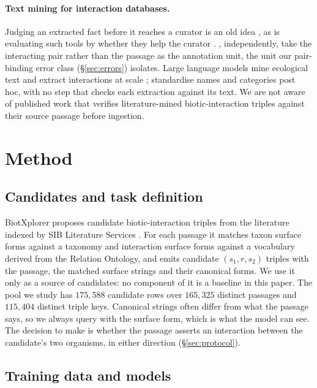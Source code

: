 \documentclass[11pt]{article}
\begin{document}
\paragraph{Text mining for interaction databases.}
Judging an extracted fact before it reaches a curator is an old idea
\citep{rodriguezesteban2006imitating}, as is evaluating such tools by whether they help the curator
\citep{hirschman2012biocuration,britan2018nexta5,lee2018scaling}. \citet{cuzick2023interspecies},
independently, take the interacting pair rather than the passage as the annotation unit, the unit
our pair-binding error class (\S\ref{sec:errors}) isolates. Large language models mine ecological text
\citep{farrell2024landscape,dsouza2025mining} and extract interactions at scale
\citep{keck2025extracting,zou2026llm}; \citet{zou2026llm} standardise names and categories post
hoc, with no step that checks each extraction against its text. We are not aware of published work
that verifies literature-mined biotic-interaction triples against their source passage before
ingestion.

\section{Method}
\label{sec:method}

\subsection{Candidates and task definition}
\label{sec:setting}

BiotXplorer \citep{ruch2024biotxplorer} proposes candidate biotic-interaction triples from the
literature indexed by SIB Literature Services \citep{gobeill2020sibils}. For each passage it matches
taxon surface forms against a taxonomy and interaction surface forms against a vocabulary derived
from the Relation Ontology, and emits candidate $(s_1, r, s_2)$ triples with the passage, the matched
surface strings and their canonical forms. We use it only as a source of candidates: no component of
it is a baseline in this paper. The pool we study has $175{,}588$ candidate rows over $165{,}325$
distinct passages and $115{,}404$ distinct triple keys. Canonical strings often differ from what
the passage says, so we always query with the surface form, which is what the model can see. The
decision to make is whether the passage asserts an interaction between the candidate's two
organisms, in either direction (\S\ref{sec:protocol}).

\subsection{Training data and models}
\label{sec:verifier}
\end{document}
